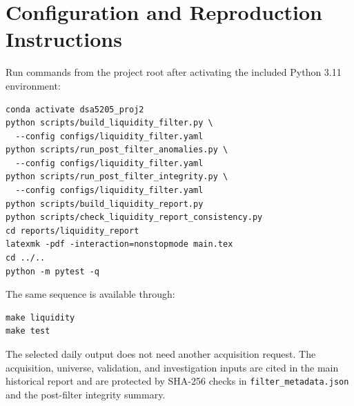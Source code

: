 \section{Configuration and Reproduction Instructions}

Run commands from the project root after activating the included Python 3.11
environment:

\begin{verbatim}
conda activate dsa5205_proj2
python scripts/build_liquidity_filter.py \
  --config configs/liquidity_filter.yaml
python scripts/run_post_filter_anomalies.py \
  --config configs/liquidity_filter.yaml
python scripts/run_post_filter_integrity.py \
  --config configs/liquidity_filter.yaml
python scripts/build_liquidity_report.py
python scripts/check_liquidity_report_consistency.py
cd reports/liquidity_report
latexmk -pdf -interaction=nonstopmode main.tex
cd ../..
python -m pytest -q
\end{verbatim}

The same sequence is available through:

\begin{verbatim}
make liquidity
make test
\end{verbatim}

The selected daily output does not need another acquisition request. The
acquisition, universe, validation, and investigation inputs are cited in the
main historical report and are protected by SHA-256 checks in
\texttt{filter\_metadata.json} and the post-filter integrity summary.
